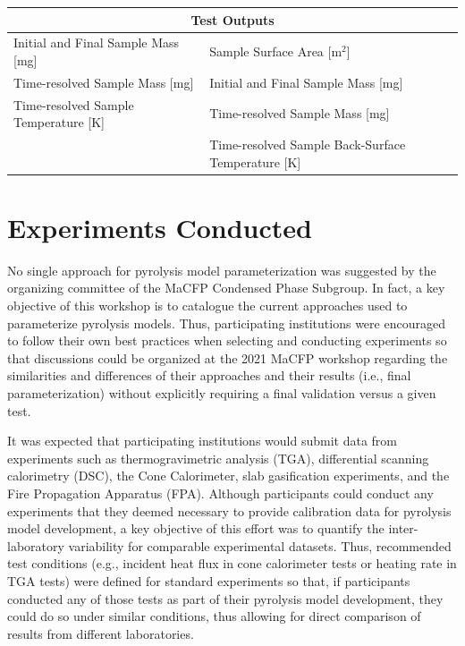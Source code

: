 \documentclass{book}
\begin{document}
\begin{table}[ht]
\begin{center}
\begin{tabular}{ll}
\multicolumn{2}{c}{Test Outputs}                                                                         \\ \hline
Initial and Final Sample Mass [mg]                & Sample Surface Area [m$^2$]                             \\
Time-resolved Sample Mass [mg]                    & Initial and Final Sample Mass [mg]                   \\
Time-resolved Sample Temperature [K]              & Time-resolved Sample Mass [mg]                       \\
                                                  & Time-resolved Sample Back-Surface Temperature [K]    \\
\end{tabular}
\end{center}
\end{table}



\chapter{Experiments Conducted}

No single approach for pyrolysis model parameterization was suggested by the organizing committee of the MaCFP Condensed Phase Subgroup. In fact, a key objective of this workshop is to catalogue the current approaches used to parameterize pyrolysis models. Thus, participating institutions were encouraged to follow their own best practices when selecting and conducting experiments so that discussions could be organized at the 2021 MaCFP workshop regarding the similarities and differences of their approaches and their results (i.e., final parameterization) without explicitly requiring a final validation versus a given test.

It was expected that participating institutions would submit data from experiments such as thermogravimetric analysis (TGA), differential scanning calorimetry (DSC), the Cone Calorimeter, slab gasification experiments, and the Fire Propagation Apparatus (FPA). Although participants could conduct any experiments that they deemed necessary to provide calibration data for pyrolysis model development, a key objective of this effort was to quantify the inter-laboratory variability for comparable experimental datasets. Thus, recommended test conditions (e.g., incident heat flux in cone calorimeter tests or heating rate in TGA tests) were defined for standard experiments so that, if participants conducted any of those tests as part of their pyrolysis model development, they could do so under similar conditions, thus allowing for direct comparison of results from different laboratories.
\end{document}
